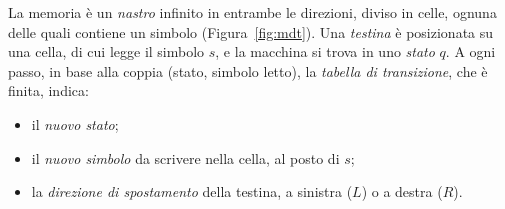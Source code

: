\documentclass[a4paper, 11pt, oneside]{book}
\theoremstyle{formale}
\begin{document}
    La memoria \`e un \emph{nastro} infinito in entrambe le direzioni, diviso in celle,
    ognuna delle quali contiene un simbolo (Figura~\ref{fig:mdt}). Una \emph{testina}
    \`e posizionata su una cella, di cui legge il simbolo $s$, e la macchina si trova in
    uno \emph{stato} $q$. A ogni passo, in base alla coppia (stato, simbolo letto), la
    \emph{tabella di transizione}, che \`e finita, indica:
    \begin{itemize}
        \item il \emph{nuovo stato};
        \item il \emph{nuovo simbolo} da scrivere nella cella, al posto di $s$;
        \item la \emph{direzione di spostamento} della testina, a sinistra ($L$) o a
            destra ($R$).
    \end{itemize}
\end{document}
